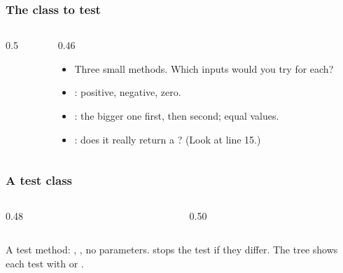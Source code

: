 \documentclass[aspectratio=169,10pt,compress]{beamer}
\begin{document}
\begin{frame}[t,fragile] \frametitle{The class to test}
  \begin{columns}[T]
    \begin{column}{0.5\textwidth}
    \end{column}
    \begin{column}{0.46\textwidth}
      \begin{itemize}\small
        \item Three small methods. Which inputs would you try for each?
        \item {}: positive, negative, zero.
        \item {}: the bigger one first, then second; equal values.
        \item {}: does it really return a ? (Look at line 15.)
      \end{itemize}
    \end{column}
  \end{columns}
\end{frame}




\begin{frame}[t,fragile] \frametitle{A test class}
  \begin{columns}[T]
    \begin{column}{0.48\textwidth}
    \end{column}
    \begin{column}{0.50\textwidth}
    \end{column}
  \end{columns}

  \vspace{0.2em}
  \small A test method: , , no parameters.  stops the test
  if they differ. The tree shows each test with \hCode{[OK]} or \hCode{[X]}.
\end{frame}
\end{document}
